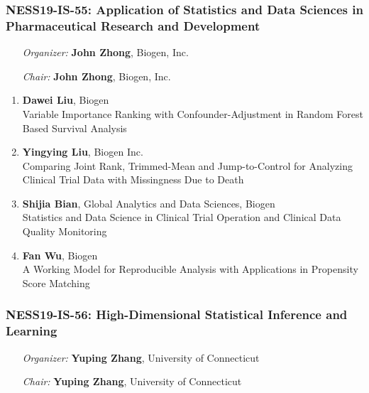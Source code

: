 \subsubsection*{NESS19-IS-55: Application of Statistics and Data Sciences in Pharmaceutical Research and Development}

\begin{enumerate}[align=left]
\item [\emph{Organizer:}] \textbf{John Zhong}, Biogen, Inc.
\item [\emph{Chair:}] \textbf{John Zhong}, Biogen, Inc.
\end{enumerate}

\begin{enumerate}
\item \textbf{Dawei Liu}, Biogen \\
Variable Importance Ranking with Confounder-Adjustment in Random Forest Based Survival Analysis
\item \textbf{Yingying Liu}, Biogen Inc. \\
Comparing Joint Rank, Trimmed-Mean and Jump-to-Control for Analyzing Clinical Trial Data with Missingness Due to Death
\item \textbf{Shijia Bian}, Global Analytics and Data Sciences, Biogen \\
Statistics and Data Science in Clinical Trial Operation and Clinical Data Quality Monitoring
\item \textbf{Fan Wu}, Biogen \\
A Working Model for Reproducible Analysis with Applications in Propensity Score Matching
\end{enumerate}

\subsubsection*{NESS19-IS-56: High-Dimensional Statistical Inference and Learning}

\begin{enumerate}[align=left]
\item [\emph{Organizer:}] \textbf{Yuping Zhang}, University of Connecticut
\item [\emph{Chair:}] \textbf{Yuping Zhang}, University of Connecticut
\end{enumerate}

